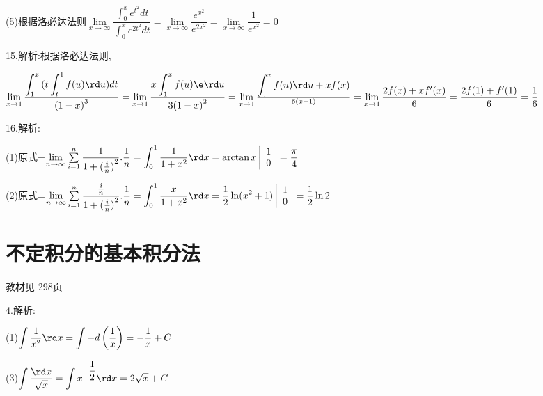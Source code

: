 (5)根据洛必达法则$\mathop {\lim }\limits_{x \to \infty } \dfrac{{\displaystyle\int_0^x {{e^{{t^2}}}dt} }}{{\displaystyle\int_0^x {{e^{2{t^2}}}dt} }} = \mathop {\lim }\limits_{x \to \infty } \dfrac{{{e^{{x^2}}}}}{{{e^{2{x^2}}}}} = \mathop {\lim }\limits_{x \to \infty } \dfrac{1}{{{e^{{x^2}}}}} = 0$

15.解析:根据洛必达法则,

$\mathop {\lim }\limits_{x \to 1} \dfrac{{\displaystyle\int_1^x {(t\displaystyle\int_t^1 {f(u)\rd u)dt} } }}{{{{(1 - x)}^3}}} = \mathop {\lim }\limits_{x \to 1} \dfrac{{x\displaystyle\int_1^x {f(u)\e\rd u} }}{{3{{(1 - x)}^2}}} = \mathop {\lim }\limits_{x \to 1} \frac{{\displaystyle\int_1^x {f(u)\rd u}  + xf(x)}}{{6(x - 1)}} = \mathop {\lim }\limits_{x \to 1} \dfrac{{2f(x) + xf'(x)}}{6} = \dfrac{{2f(1) + f'(1)}}{6} = \dfrac{1}{6}$

16.解析:

(1)原式=$\mathop {\lim }\limits_{n \to \infty } \sum\limits_{i = 1}^n {\dfrac{1}{{1 + {{(\frac{i}{n})}^2}}}} .\dfrac{1}{n} = \displaystyle\int_0^1 {\dfrac{1}{{1 + {x^2}}}} \rd x = \arctan x\left| {\begin{array}{*{20}{c}}
  1 \\ 
  0 
\end{array}} \right. = \dfrac{\pi }{4}$

(2)原式=$\mathop {\lim }\limits_{n \to \infty } \sum\limits_{i = 1}^n {\dfrac{{\frac{i}{n}}}{{1 + {{(\frac{i}{n})}^2}}}} .\dfrac{1}{n} = \displaystyle\int_0^1 {\dfrac{x}{{1 + {x^2}}}} \rd x = \dfrac{1}{2}\ln ({x^2} + 1)\left| {\begin{array}{*{20}{c}}
  1 \\ 
  0 
\end{array}} \right. = \dfrac{1}{2}\ln 2$



\section{不定积分的基本积分法}
\begin{flushright}
  \color{zhanqing!80}
  \color{zhanqing!80}
   教材见 298页 %
\end{flushright}

4.解析:

(1)$\displaystyle\int {\dfrac{1}{{{x^2}}}\rd x}  = \displaystyle\int { - d\left( {\dfrac{1}{x}} \right)}  =  - \dfrac{1}{x} + C$

(3)$\displaystyle\int {\dfrac{{\rd x}}{{\sqrt x }}}  = \displaystyle\int {{x^{ - \dfrac{1}{2}}}} \rd x = 2\sqrt x  + C$

